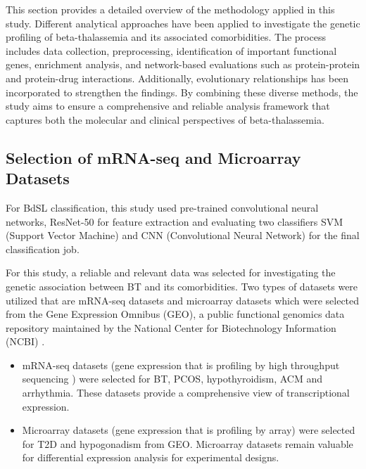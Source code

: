 This section provides a detailed overview of the methodology applied in this study. Different analytical approaches have been applied to investigate the genetic profiling of beta-thalassemia and its associated comorbidities. The process includes data collection, preprocessing, identification of important functional genes, enrichment analysis, and network-based evaluations such as protein-protein and protein-drug interactions. Additionally, evolutionary relationships has been incorporated to strengthen the findings. By combining these diverse methods, the study aims to ensure a comprehensive and reliable analysis framework that captures both the molecular and clinical perspectives of beta-thalassemia.

\subsection{Selection of mRNA-seq and Microarray Datasets}
\label{sec:sec3_4_1}
For BdSL classification, this study used pre-trained convolutional neural networks, ResNet-50 for feature extraction and evaluating two classifiers SVM (Support Vector Machine) and CNN (Convolutional Neural Network) for the final classification job.

For this study, a reliable and relevant data was selected for investigating the genetic association between BT and its comorbidities. Two types of datasets were utilized that are mRNA-seq datasets and microarray datasets which were selected from the Gene Expression Omnibus (GEO), a public functional genomics data repository maintained by the National Center for Biotechnology Information (NCBI) \cite{b10}.

\begin{itemize}
    \item mRNA-seq datasets (gene expression that is profiling by high throughput sequencing ) were selected for BT, PCOS, hypothyroidism, ACM and arrhythmia. These datasets provide a comprehensive view of transcriptional expression.
    \item Microarray datasets (gene expression that is profiling by array) were selected for T2D and hypogonadism from GEO. Microarray datasets remain valuable for differential expression analysis for experimental designs.
\end{itemize}



